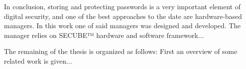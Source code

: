 \vspace{10pt}
In conclusion, storing and protecting passwords is a very important element of digital security, and one of the best approaches to the date are hardware-based managers. In this work one of said managers was designed and developed. The manager relies on SECUBE™ hardware and software framework...

\vspace{10pt}

The remaining of the thesis is organized as follows: First an overview of some related work is given...



